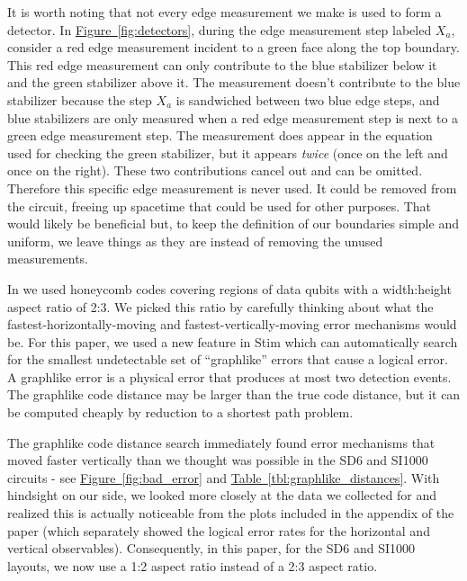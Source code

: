 \documentclass[onecolumn,unpublished,a4paper]{quantumarticle}
\theoremstyle{definition}
\theoremstyle{definition}
\theoremstyle{definition}
\newcommand{\fig}[1]{\hyperref[fig:#1]{Figure~\ref*{fig:#1}}}
\newcommand{\tbl}[1]{\hyperref[tbl:#1]{Table~\ref*{tbl:#1}}}
\begin{document}
It is worth noting that not every edge measurement we make is used to form a detector.  
In \fig{detectors}, during the edge measurement step labeled $X_a$, consider a red edge measurement incident to a green face along the top boundary.
This red edge measurement can only contribute to the blue stabilizer below it and the green stabilizer above it.
The measurement doesn't contribute to the blue stabilizer because the step $X_a$ is sandwiched between two blue edge steps, and blue stabilizers are only measured when a red edge measurement step is next to a green edge measurement step.
The measurement does appear in the equation used for checking the green stabilizer, but it appears \emph{twice} (once on the left and once on the right).
These two contributions cancel out and can be omitted.
Therefore this specific edge measurement is never used.
It could be removed from the circuit, freeing up spacetime that could be used for other purposes.
That would likely be beneficial but, to keep the definition of our boundaries simple and uniform, we leave things as they are instead of removing the unused measurements.

In \cite{gidney2021honeycombmemory} we used honeycomb codes covering regions of data qubits with a width:height aspect ratio of 2:3.
We picked this ratio by carefully thinking about what the fastest-horizontally-moving and fastest-vertically-moving error mechanisms would be.
For this paper, we used a new feature in Stim which can automatically search for the smallest undetectable set of ``graphlike'' errors that cause a logical error.
A graphlike error is a physical error that produces at most two detection events.
The graphlike code distance may be larger than the true code distance, but it can be computed cheaply by reduction to a shortest path problem.

The graphlike code distance search immediately found error mechanisms that moved faster vertically than we thought was possible in the SD6 and SI1000 circuits - see \fig{bad_error} and \tbl{graphlike_distances}.
With hindsight on our side, we looked more closely at the data we collected for \cite{gidney2021honeycombmemory} and realized this is actually noticeable from the plots included in the appendix of the paper (which separately showed the logical error rates for the horizontal and vertical observables).
Consequently, in this paper, for the SD6 and SI1000 layouts, we now use a 1:2 aspect ratio instead of a 2:3 aspect ratio.
\end{document}
